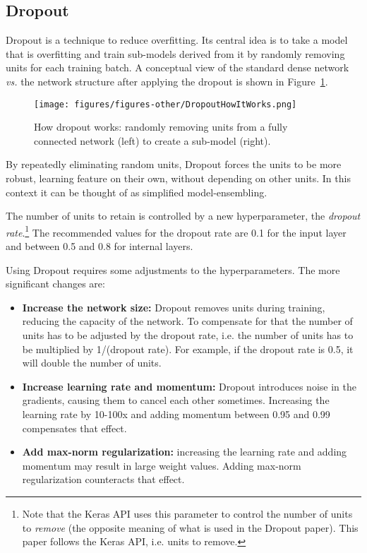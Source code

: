 \documentclass[../dropout-vs-batch-normalization.tex]{subfiles}
\begin{document}
\subsection{Dropout}

Dropout \cite{Srivastava2014} is a technique to reduce overfitting. Its central idea is to take a model that is overfitting and train sub-models derived from it by randomly removing units for each training batch. A conceptual view of the standard dense network \textit{vs.} the network structure after applying the dropout is shown in Figure~\ref{fig:DropoutHowItWorks}.

\begin{figure}
\centerline{\texttt{[image: figures/figures-other/DropoutHowItWorks.png]}}
\caption{How dropout works: randomly removing units from a fully connected network (left) to create a sub-model (right).}
\label{fig:DropoutHowItWorks}
\end{figure}

By repeatedly eliminating random units, Dropout forces the units to be more robust, learning feature on their own, without depending on other units. In this context it can be thought of as simplified model-ensembling.

The number of units to retain is controlled by a new hyperparameter, the \textit{dropout rate}.\footnote{Note that the Keras API uses this parameter to control the number of units to \textit{remove} (the opposite meaning of what is used in the Dropout paper). This paper follows the Keras API, i.e. units to remove.} The recommended values for the dropout rate are 0.1 for the input layer and between 0.5 and 0.8 for internal layers.

Using Dropout requires some adjustments to the hyperparameters. The more significant changes are:

\begin{itemize}
\item \textbf{Increase the network size:} Dropout removes units during training, reducing the capacity of the network. To compensate for that the number of units has to be adjusted by the dropout rate, i.e. the number of units has to be multiplied by 1/(dropout rate). For example, if the dropout rate is 0.5, it will double the number of units.
\item \textbf{Increase learning rate and momentum:} Dropout introduces noise in the gradients, causing them to cancel each other sometimes. Increasing the learning rate by 10-100x and adding momentum between 0.95 and 0.99 compensates that effect.
\item \textbf{Add max-norm regularization:} increasing the learning rate and adding momentum may result in large weight values. Adding max-norm regularization counteracts that effect.
\end{itemize}
\end{document}
